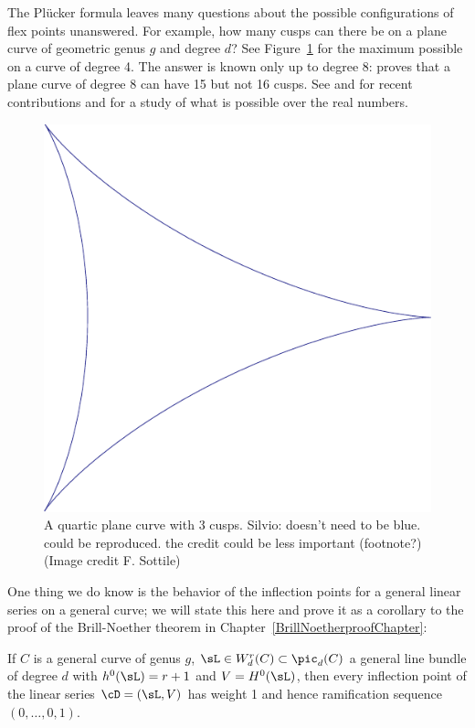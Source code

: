 The Pl\"ucker formula leaves many questions about the possible configurations of flex points unanswered. 
For example, how many cusps can there be on a plane curve of geometric genus $g$ and degree $d$? See
Figure~\ref{3 real cusps} for the maximum possible on a curve of degree 4.
The answer is known only up to degree 8: \cite{Zariski1931} proves that a plane curve of degree 8 can have 15 but not 16 cusps.
See \cite{Calabri} and \cite{Kulikov} for recent contributions and \cite{Kharlamov-Sottile} for a study of what is possible
over the real numbers.

\begin{figure}\label{3-cusp quartic}
\centerline{ \includegraphics[scale=.5]{"main/Fig12-1-threeCusps"}}
 \caption{A quartic plane curve with 3 cusps. {Silvio: doesn't need to be blue.
 could be reproduced. the credit could be less important (footnote?) (Image credit F. Sottile)}}
 \label{3 real cusps}
\end{figure}

One thing we do know is the behavior of the inflection points for a general linear series on a general curve; we will state this here and prove it as a corollary to the proof of the Brill-Noether theorem in Chapter~\ref{BrillNoetherproofChapter}:

\begin{theorem}\label{Brill Noether Plucker}
If $C$ is a general curve of genus $g$, $\sL \in W^r_d(C) \subset \pic_d(C)$ a general line bundle of degree $d$ with $h^0(\sL) = r+1$ and $V = H^0(\sL)$, then every inflection point of the linear series $\cD = (\sL, V)$ has weight 1 and hence ramification sequence $(0, \dots, 0, 1)$.
\end{theorem}


